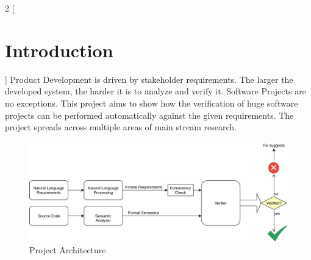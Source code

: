\begin{multicols*}{2}
	[\section{Introduction}]
	Product Development is driven by stakeholder requirements. The larger the developed system, the harder it is to analyze and verify it. Software Projects are no exceptions. This project aims to show how the verification of huge software projects can be performed automatically against the given requirements. The project spreads across multiple areas of main stream research.
	
	\begin{figure}[H]
		\centering
		\includegraphics[width=1\linewidth]{../Architecture}
		\caption[PorjArch]{Project Architecture}
		\label{fig:architecture}
	\end{figure}
	

\end{multicols*}
